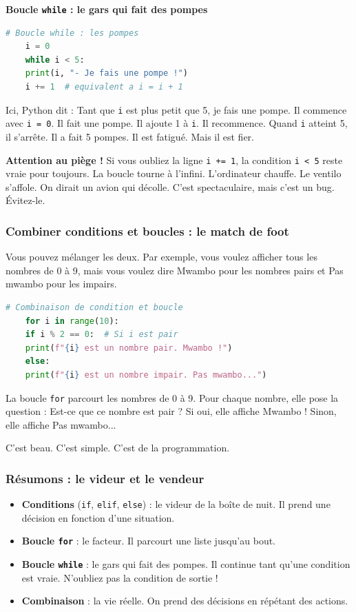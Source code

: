 \documentclass[12pt,a4paper]{article}
\begin{document}
\textbf{Boucle \texttt{while} : le gars qui fait des pompes}

\begin{lstlisting}[language=Python]
	# Boucle while : les pompes
	i = 0
	while i < 5:
	print(i, "- Je fais une pompe !")
	i += 1  # equivalent a i = i + 1
\end{lstlisting}

Ici, Python dit : \og Tant que \texttt{i} est plus petit que 5, je fais une pompe. \fg Il commence avec \texttt{i = 0}. Il fait une pompe. Il ajoute 1 à \texttt{i}. Il recommence. Quand \texttt{i} atteint 5, il s'arrête. Il a fait 5 pompes. Il est fatigué. Mais il est fier.

\textbf{Attention au piège !} Si vous oubliez la ligne \texttt{i += 1}, la condition \texttt{i < 5} reste vraie pour toujours. La boucle tourne à l'infini. L'ordinateur chauffe. Le ventilo s'affole. On dirait un avion qui décolle. C'est spectaculaire, mais c'est un bug. Évitez-le.

\subsubsection{Combiner conditions et boucles : le match de foot}

Vous pouvez mélanger les deux. Par exemple, vous voulez afficher tous les nombres de 0 à 9, mais vous voulez dire \og Mwambo \fg pour les nombres pairs et \og Pas mwambo \fg pour les impairs.

\begin{lstlisting}[language=Python]
	# Combinaison de condition et boucle
	for i in range(10):
	if i % 2 == 0:  # Si i est pair
	print(f"{i} est un nombre pair. Mwambo !")
	else:
	print(f"{i} est un nombre impair. Pas mwambo...")
\end{lstlisting}

La boucle \texttt{for} parcourt les nombres de 0 à 9. Pour chaque nombre, elle pose la question : \og Est-ce que ce nombre est pair ? \fg Si oui, elle affiche \og Mwambo ! \fg Sinon, elle affiche \og Pas mwambo... \fg

C'est beau. C'est simple. C'est de la programmation.

\subsubsection{Résumons : le videur et le vendeur}

\begin{itemize}
	\item [\ding{172}] \textbf{Conditions} (\texttt{if}, \texttt{elif}, \texttt{else}) : le videur de la boîte de nuit. Il prend une décision en fonction d'une situation.
	\item [\ding{173}] \textbf{Boucle \texttt{for}} : le facteur. Il parcourt une liste jusqu'au bout.
	\item [\ding{174}] \textbf{Boucle \texttt{while}} : le gars qui fait des pompes. Il continue tant qu'une condition est vraie. N'oubliez pas la condition de sortie !
	\item [\ding{175}] \textbf{Combinaison} : la vie réelle. On prend des décisions en répétant des actions.
\end{itemize}
\end{document}
